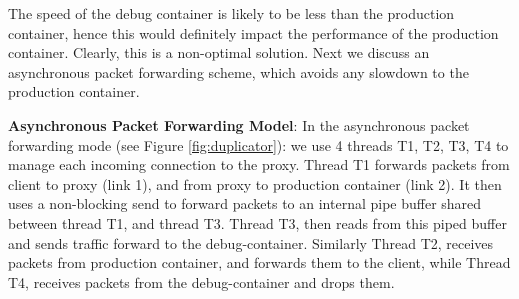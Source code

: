 The speed of the debug container is likely to be less than the production container, hence this would definitely impact the performance of the production container.
Clearly, this is a non-optimal solution. 
Next we discuss an asynchronous packet forwarding scheme, which avoids any slowdown to the production container.


\textbf{Asynchronous Packet Forwarding Model}: 
In the asynchronous packet forwarding mode (see Figure \ref{fig:duplicator}): we use 4 threads T1, T2, T3, T4 to manage each incoming connection to the proxy.
Thread T1 forwards packets from client to proxy (link 1), and from proxy to production container (link 2). 
It then uses a non-blocking send to forward packets to an internal pipe buffer shared between thread T1, and thread T3. 
Thread T3, then reads from this piped buffer and sends traffic forward to the debug-container. 
Similarly Thread T2, receives packets from production container, and forwards them to the client, while Thread T4, receives packets from the debug-container and drops them.

